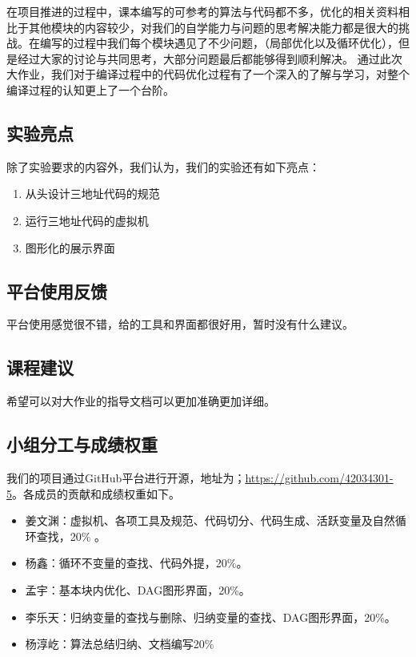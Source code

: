 \documentclass[cn,black,11pt,normal]{elegantnote}
\begin{document}
在项目推进的过程中，课本编写的可参考的算法与代码都不多，优化的相关资料相比于其他模块的内容较少，对我们的自学能力与问题的思考解决能力都是很大的挑战。在编写的过程中我们每个模块遇见了不少问题，（局部优化以及循环优化），但是经过大家的讨论与共同思考，大部分问题最后都能够得到顺利解决。
通过此次大作业，我们对于编译过程中的代码优化过程有了一个深入的了解与学习，对整个编译过程的认知更上了一个台阶。


\subsection{实验亮点}

除了实验要求的内容外，我们认为，我们的实验还有如下亮点：
\begin{enumerate}
    \item 从头设计三地址代码的规范
    \item 运行三地址代码的虚拟机
    \item 图形化的展示界面
\end{enumerate}

\subsection{平台使用反馈}

平台使用感觉很不错，给的工具和界面都很好用，暂时没有什么建议。

\subsection{课程建议}

希望可以对大作业的指导文档可以更加准确更加详细。

\subsection{小组分工与成绩权重}

我们的项目通过GitHub平台进行开源，地址为；\url{https://github.com/42034301-5}。各成员的贡献和成绩权重如下。

\begin{itemize}
    \item 姜文渊：虚拟机、各项工具及规范、代码切分、代码生成、活跃变量及自然循环查找，20\% 。
    \item 杨鑫：循环不变量的查找、代码外提，20\%。
    \item 孟宇：基本块内优化、DAG图形界面，20\%。
    \item 李乐天：归纳变量的查找与删除、归纳变量的查找、DAG图形界面，20\%。
    \item 杨淳屹：算法总结归纳、文档编写20\%
\end{itemize}
\end{document}
